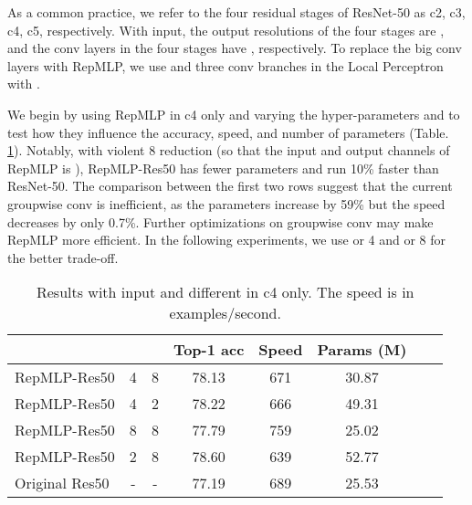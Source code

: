 \documentclass[10pt,twocolumn,letterpaper]{article}
\begin{document}
As a common practice, we refer to the four residual stages of ResNet-50 as c2, c3, c4, c5, respectively. With  input, the output resolutions of the four stages are , and the  conv layers in the four stages have , respectively. To replace the big  conv layers with RepMLP, we use  and three conv branches in the Local Perceptron with . 

We begin by using RepMLP in c4 only and varying the hyper-parameters  and  to test how they influence the accuracy, speed, and number of parameters (Table. \ref{table-c4-gr}). Notably, with violent 8 reduction (so that the input and output channels of RepMLP is ), RepMLP-Res50 has fewer parameters and run 10\% faster than ResNet-50. The comparison between the first two rows suggest that the current groupwise  conv is inefficient, as the parameters increase by 59\% but the speed decreases by only 0.7\%. Further optimizations on groupwise  conv may make RepMLP more efficient. In the following experiments, we use  or 4 and  or 8 for the better trade-off.

\setlength{\tabcolsep}{4pt}
\begin{table}
	\caption{Results with  input and different  in c4 only. The speed is in examples/second.}
	\label{table-c4-gr}
	\vspace{-0.25in}
	\begin{center}
		\small
		\begin{tabular}{lccccccc}
			\hline
			&				&	  		&	Top-1 acc	&	Speed	&	Params (M)	\\
			\hline
RepMLP-Res50	&4				&	8					&	78.13		&	671		&	30.87	\\
RepMLP-Res50	&4				&	2					&	78.22		&	666		&	49.31	\\
			RepMLP-Res50	&8				&	8					&	77.79		&	759		&	25.02	\\
			RepMLP-Res50	&2				&	8					&	78.60		&	639		&	52.77	\\
			Original Res50	&-				&	-					&	77.19		&	689		&	25.53	\\
			\hline
		\end{tabular}
	\end{center}
	\vspace{-0.15in}
\end{table}
\setlength{\tabcolsep}{1.4pt}
\end{document}
